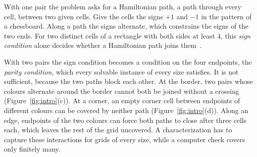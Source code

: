 \documentclass[11pt]{article}
\begin{document}
With one pair the problem asks for a Hamiltonian path, a path through every cell, between two
given cells. Give the cells the signs $+1$ and $-1$ in the pattern of a chessboard. Along a path
the signs alternate, which constrains the signs of the two ends. For two distinct cells of a
rectangle with both sides at least $4$, this \emph{sign condition} alone decides whether a
Hamiltonian path joins them~\cite{ips82}.

With two pairs the sign condition becomes a condition on the four endpoints, the \emph{parity
condition}, which every solvable instance of every size satisfies. It is not sufficient, because
the two paths block each other. At the border, two pairs whose colours alternate around the border
cannot both be joined without a crossing (Figure~\ref{fig:intro}(c)). At a corner, an empty
corner cell between endpoints of different colours can be covered by neither path
(Figure~\ref{fig:intro}(d)). Along an edge, endpoints of the two colours can force both paths to
close after three cells each, which leaves the rest of the grid uncovered. A characterization has
to capture these interactions for grids of every size, while a computer check covers only finitely
many.
\end{document}
